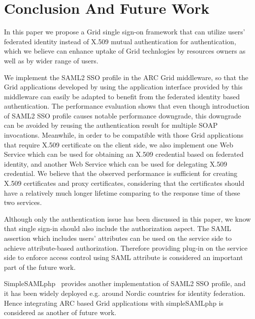 \documentclass[conference]{IEEEtran}
\begin{document}
\section{Conclusion And Future Work}
\label{sec:conclusion}
In this paper we propose a Grid single sign-on framework that can utilize
users' federated identity instead of X.509 mutual authentication for authentication,
which we believe can enhance uptake of Grid technlogies by resources owners as well as
by wider range of users.

We implement the SAML2 SSO profile in the ARC Grid middleware, so that the Grid
applications developed by using the application interface provided by this middleware
can easily be adapted to benefit from the federated identity based authentication. 
The performance evaluation shows that even though introduction of SAML2 SSO
profile causes notable performance downgrade, this downgrade can be avoided by reusing the
authentication result for multiple SOAP invocations.
Meanwhile, in order to be compatible with those Grid applications that require
X.509 certificate on the client side, we also implement one Web Service which can be
used for obtaining an X.509 credential based on federated identity, and another Web
Service which can be used for delegating X.509 credential. We believe that the
observed performance is sufficient for creating X.509 certificates and proxy certificates,
considering that the certificates should have a relatively much longer lifetime comparing to the
response time of these two services.
 
Although only the authentication issue has been discussed in this paper, we know that
single sign-in should also include the authorization aspect. The SAML assertion which
includes users' attributes can be used on the service side to achieve attribute-based
authorization. Therefore providing plug-in on the service side to enforce access control using
SAML attribute is considered an important part of the future work.

SimpleSAMLphp~\cite{simplesamllink} provides another implementation of SAML2 SSO
profile, and it has been widely deployed e.g. around Nordic countries for identity federation. Hence
integrating ARC based Grid applications with simpleSAMLphp is considered as another of
future work.
\end{document}
